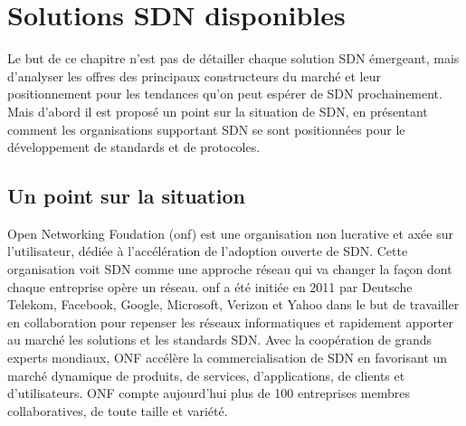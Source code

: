 \chapter{Solutions SDN disponibles}

Le but de ce chapitre n'est pas de détailler chaque solution SDN émergeant, mais d'analyser les offres des principaux constructeurs du marché et leur positionnement pour les tendances qu'on peut espérer de SDN prochainement.
Mais d'abord il est proposé un point sur la situation de SDN, en présentant comment les organisations supportant SDN se sont positionnées pour le développement de standards et de protocoles.




\section{Un point sur la situation}




Open Networking Foudation (\gls{onf}) est une organisation non lucrative et axée sur l'utilisateur, dédiée à l'accélération de l'adoption ouverte de SDN. Cette organisation voit SDN comme une approche réseau qui va changer la façon dont chaque entreprise opère un réseau.
\gls{onf} a été initiée en 2011 par Deutsche Telekom, Facebook, Google, Microsoft, Verizon et Yahoo dans le but de travailler en collaboration pour repenser les réseaux informatiques et rapidement apporter au marché les solutions et les standards SDN. Avec la coopération de grands experts mondiaux, ONF accélère la commercialisation de SDN en favorisant un  marché dynamique de produits, de services, d'applications, de clients et d'utilisateurs. ONF compte aujourd'hui plus de 100 entreprises membres collaboratives, de toute taille et variété. \cite{ONFOverview}

